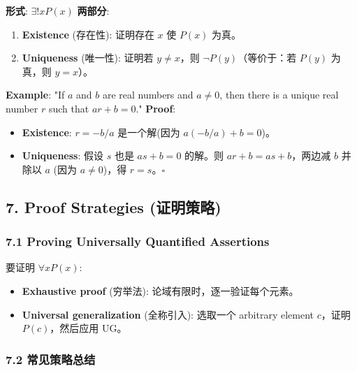 \documentclass[10pt,a4paper,openany]{ctexbook}
\theoremstyle{definition}
\theoremstyle{remark}
\begin{document}
\textbf{形式}: $\exists! x P(x)$
\textbf{两部分}:
\begin{enumerate}
\item \textbf{Existence} (存在性): 证明存在 $x$ 使 $P(x)$ 为真。
\item \textbf{Uniqueness} (唯一性): 证明若 $y \neq x$，则 $\neg P(y)$（等价于：若 $P(y)$ 为真，则 $y = x$）。

\end{enumerate}

\textbf{Example}: "If $a$ and $b$ are real numbers and $a \neq 0$, then there is a unique real number $r$ such that $ar + b = 0$."
\textbf{Proof}:
\begin{itemize}
\item \textbf{Existence}: $r = -b/a$ 是一个解(因为 $a(-b/a) + b = 0$)。
\item \textbf{Uniqueness}: 假设 $s$ 也是 $as + b = 0$ 的解。则 $ar + b = as + b$，两边减 $b$ 并除以 $a$ (因为 $a \neq 0$)，得 $r = s$。$\square$

\end{itemize}

\vspace{-2pt}

\subsection{7. Proof Strategies (证明策略)}

\subsubsection{7.1 Proving Universally Quantified Assertions}

要证明 $\forall x P(x)$:
\begin{itemize}
\item \textbf{Exhaustive proof} (穷举法): 论域有限时，逐一验证每个元素。
\item \textbf{Universal generalization} (全称引入): 选取一个 arbitrary element $c$，证明 $P(c)$，然后应用 UG。

\end{itemize}

\subsubsection{7.2 常见策略总结}
\end{document}
